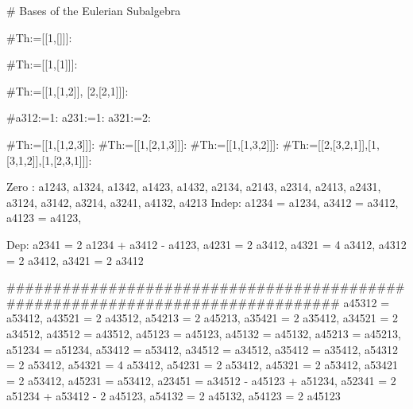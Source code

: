 #
Bases of the Eulerian Subalgebra


#Th:=[[1,[]]]:

#Th:=[[1,[1]]]:

#Th:=[[1,[1,2]], [2,[2,1]]]:


#a312:=1: a231:=1: a321:=2: 

#Th:=[[1,[1,2,3]]]:
#Th:=[[1,[2,1,3]]]:
#Th:=[[1,[1,3,2]]]:
#Th:=[[2,[3,2,1]],[1,[3,1,2]],[1,[2,3,1]]]:


Zero : 
{a1243, a1324, a1342, a1423, a1432, a2134, a2143, a2314,
 a2413, a2431, a3124, a3142, a3214, a3241, a4132, a4213}
Indep:  a1234 = a1234, 
        a3412 = a3412, 
        a4123 = a4123, 

Dep:
a2341 = 2 a1234 + a3412 - a4123, 
a4231 = 2 a3412, 
a4321 = 4 a3412, 
a4312 = 2 a3412,
a3421 = 2 a3412

###############################################################################
{a45312 = a53412, a43521 = 2 a43512, a54213 = 2 a45213, a35421 = 2 a35412, 
 a34521 = 2 a34512, a43512 = a43512, a45123 = a45123, a45132 = a45132, 
 a45213 = a45213, a51234 = a51234,  a53412 = a53412, a34512 = a34512, 
 a35412 = a35412, a54312 = 2 a53412, a54321 = 4 a53412, a54231 = 2 a53412, 
 a45321 = 2 a53412, a53421 = 2 a53412, a45231 = a53412, 
 a23451 = a34512 - a45123 + a51234, a52341 = 2 a51234 + a53412 - 2 a45123, 
          a54132 = 2 a45132, a54123 = 2 a45123}
